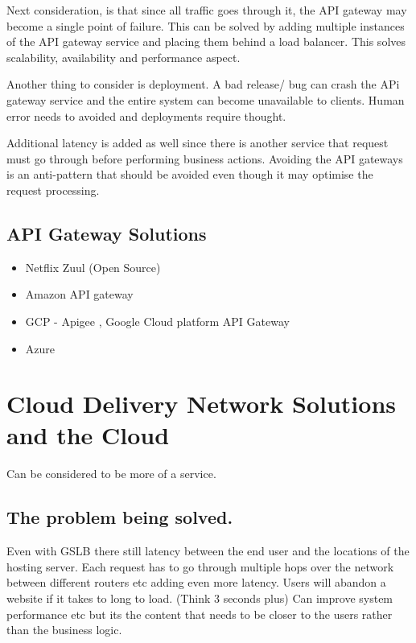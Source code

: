 \documentclass[a4paper, 11pt]{book}
\begin{document}
    Next consideration, is that since all traffic goes through it, the API gateway may become a single point of failure.
    This can be solved by adding multiple instances of the API gateway service and placing them behind a load balancer.
    This solves scalability, availability and performance aspect.

    Another thing to consider is deployment.
    A bad release/ bug can crash the APi gateway service and the entire system can become unavailable to clients.
    Human error needs to avoided and deployments require thought.

    Additional latency is added as well since there is another service that request must go through before performing business actions.
    Avoiding the API gateways is an anti-pattern that should be avoided even though it may optimise the request processing.

    \subsection{API Gateway Solutions}
    \begin{itemize}
        \item Netflix Zuul (Open Source)
        \item Amazon API gateway
        \item GCP - Apigee , Google Cloud platform API Gateway
        \item Azure
    \end{itemize}


    \section{Cloud Delivery Network Solutions and the Cloud}
    Can be considered to be more of a service.

    \subsection{The problem being solved.}
    Even with GSLB there still latency between the end user and the locations of the hosting server.
    Each request has to go through multiple hops over the network between different routers etc adding even more latency.
    Users will abandon a website if it takes to long to load. (Think 3 seconds plus)
    Can improve system performance etc but its the content that needs to be closer to the users rather than the business logic.
\end{document}
